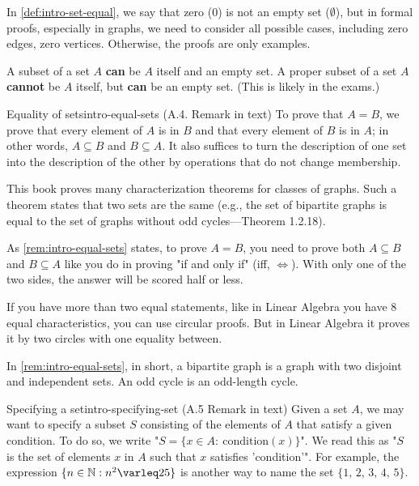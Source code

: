 \documentclass[../src/handouts/main.tex]{subfiles}
\begin{document}
In \cref{def:intro-set-equal}, we say that zero (0) is not an empty set ($\emptyset$), but in formal proofs, especially in graphs, we need to consider all possible cases, including zero edges, zero vertices. Otherwise, the proofs are only examples.

A subset of a set $A$ \textbf{can} be $A$ itself and an empty set. A proper subset of a set $A$ \textbf{cannot} be $A$ itself, but \textbf{can} be an empty set. (This is likely in the exams.)


\begin{remark}{Equality of sets}{intro-equal-sets}
  (A.4. Remark in text)
  To prove that $A = B$, we prove that every element of $A$ is in $B$ and that every element of $B$ is in $A$; in other words, $A \subseteq B$ and $B \subseteq A$. It also suffices to turn the description of one set into the description of the other by operations that do not change membership.

  This book proves many characterization theorems for classes of graphs. Such a theorem states that two sets are the same (e.g., the set of bipartite graphs is equal to the set of graphs without odd cycles---Theorem 1.2.18).
\end{remark}

As \cref{rem:intro-equal-sets} states, to prove $A = B$, you need to prove both $A \subseteq B$ and $B \subseteq A$ like you do in proving "if and only if" (iff, $\iff$). With only one of the two sides, the answer will be scored half or less.

If you have more than two equal statements, like in Linear Algebra you have 8 equal characteristics, you can use circular proofs. But in Linear Algebra it proves it by two circles with one equality between.

In \cref{rem:intro-equal-sets}, in short, a bipartite graph is a graph with two disjoint and independent sets. An odd cycle is an odd-length cycle.

\begin{remark}{Specifying a set}{intro-specifying-set}
  (A.5 Remark in text)
  Given a set $A$, we may want to specify a subset $S$ consisting of the elements of $A$ that satisfy a given condition. To do so, we write "$S = \{ x \in A:\ \text{condition}(x)\}$". We read this as "$S$ is the set of elements $x$ in $A$ such that $x$ satisfies 'condition'". For example, the expression $\{ n \in \N : n^2 \leq 25 \}$ is another way to name the set $\{ 1,\, 2,\, 3,\, 4,\, 5 \}$.
\end{remark}
\end{document}
